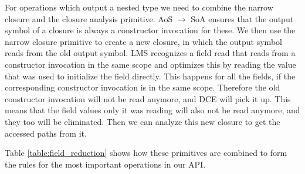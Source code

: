 For  operations which output a nested type we need to combine the narrow closure and the closure analysis primitive. AoS $\rightarrow$ SoA ensures that the output symbol of a closure is always a constructor invocation for these. We then use the narrow closure primitive to create a new closure, in which the output symbol reads from the old output symbol. LMS recognizes a field read that reads from a constructor invocation in the same scope and optimizes this by reading the value that was used to initialize the field directly. This happens for all the fields, if the corresponding constructor invocation is in the same scope. Therefore the old constructor invocation will not be read anymore, and DCE will pick it up. This means that the field values only it was reading will also not be read anymore, and they too will be eliminated. Then we can analyze this new closure to get the accessed paths from it. 


Table \ref{table:field_reduction} shows how these primitives are combined to form the rules for the most important operations in our API.

 
